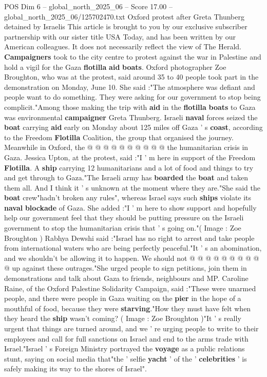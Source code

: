 \begin{textsample}{POS Dim 6 – global\_north\_2025\_06 – Score 17.00 – global\_north\_2025\_06/125702470.txt}  \label{ex:f6_pos_029}
Oxford protest after Greta Thunberg detained by Israelis This article is brought to you by our exclusive subscriber partnership with our sister title USA Today, and has been written by our American colleagues.
It does not necessarily reflect the view of The Herald. \textbf{Campaigners} took to the city centre to protest against the war in Palestine and hold a vigil for the Gaza \textbf{flotilla} \textbf{aid} \textbf{boats}.
Oxford photographer Zoe Broughton, who was at the protest, said around 35 to 40 people took part in the demonstration on Monday, June 10.
She said :"The atmosphere was defiant and people want to do something.
They were asking for our government to stop being complicit."Among those making the trip with \textbf{aid} in the \textbf{flotilla} \textbf{boats} to Gaza was environmental \textbf{campaigner} Greta Thunberg.
Israeli \textbf{naval} forces seized the \textbf{boat} carrying \textbf{aid} early on Monday about 125 miles off Gaza ' s \textbf{coast}, according to the Freedom \textbf{Flotilla} Coalition, the group that organised the journey.
Meanwhile in Oxford, the @ @ @ @ @ @ @ @ @ @ the humanitarian crisis in Gaza.
Jessica Upton, at the protest, said :"I ' m here in support of the Freedom \textbf{Flotilla}.
A \textbf{ship} carrying 12 humanitarians and a lot of food and things to try and get through to Gaza."The Israeli army has \textbf{boarded} the \textbf{boat} and taken them all.
And I think it ' s unknown at the moment where they are."She said the \textbf{boat} crew"hadn't broken any rules", whereas Israel says such \textbf{ships} violate its \textbf{naval} \textbf{blockade} of Gaza.
She added :"I ' m here to show support and hopefully help our government feel that they should be putting pressure on the Israeli government to stop the humanitarian crisis that ' s going on."( Image : Zoe Broughton ) Rabhya Dewshi said :"Israel has no right to arrest and take people from international waters who are being perfectly peaceful."It ' s an abomination, and we shouldn't be allowing it to happen.
We should not @ @ @ @ @ @ @ @ @ @ up against these outrages."She urged people to sign petitions, join them in demonstrations and talk about Gaza to friends, neighbours and MP.
Caroline Raine, of the Oxford Palestine Solidarity Campaign, said :"These were unarmed people, and there were people in Gaza waiting on the \textbf{pier} in the hope of a mouthful of food, because they were \textbf{starving}."How they must have felt when they heard the \textbf{ship} wasn't coming? ( Image : Zoe Broughton )"It ' s really urgent that things are turned around, and we ' re urging people to write to their employees and call for full sanctions on Israel and end to the arms trade with Israel."Israel ' s Foreign Ministry portrayed the \textbf{voyage} as a public relations stunt, saying on social media that"the ' selfie \textbf{yacht} ' of the ' \textbf{celebrities} ' is safely making its way to the shores of Israel".

\end{textsample}
